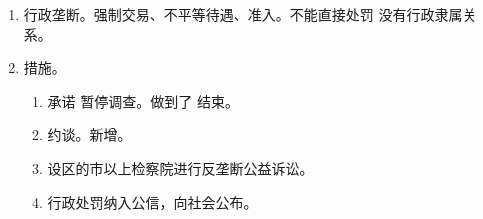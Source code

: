\begin{enumerate}
\begin{enumerate}
\begin{enumerate}
                  \item 推定规则。1个 1/2、2 个 2/3、3 个 3/4。不到 1/10 \yjt 小跟班。。
                  \item 行为。
                        \begin{enumerate}
                          \item 垄断价格。。
                          \item 强制交易。。
                          \item 低价倾销、拒绝交易、搭售行为、差别待遇。
                        \end{enumerate}
                  \item 数字经济领域反垄断。。
                  \item 法律责任。
                        \begin{enumerate}
                          \item 停止违法行为、没收违法所得。
                          \item 上年度销售额（不是利润额）1\% - 10\% 的罚款。
                          \item 新增加倍处罚（2 - 5 倍）。特别严重、恶劣、严重后果。。
                        \end{enumerate}
                \end{enumerate}
          \item 经营者集中。取得控制权。复议前置但不终局。
                \begin{enumerate}
                  \item 交易规模达到国务院规定的申报标准。\bdy 公司法的合并。。
                  \item 事先申报 \hz 主动调查。。例外。母子、兄弟公司整合。。
                  \item 分级分类审查。
                  \item 初审 \yjt 进一步审查。30 + 90 + 60。
                  \item 停表制度（中止计算期限）。少交材料；新情况、事实；经营者提出。
                  \item 股份恢复到集中前的状态。。
                \end{enumerate}
          \item \sjt 存在民事责任。。
        \end{enumerate}
  \item 行政垄断。强制交易、不平等待遇、准入。不能直接处罚 \yjt 没有行政隶属关系。
  \item 措施。
        \begin{enumerate}
          \item 承诺 \yjt 暂停调查。做到了 \yjt 结束。
          \item 约谈。新增。
          \item 设区的市以上检察院进行反垄断公益诉讼。
          \item 行政处罚纳入公信，向社会公布。
        \end{enumerate}
\end{enumerate}
